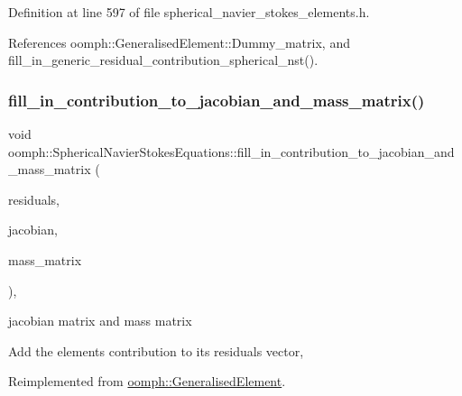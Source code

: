 Definition at line 597 of file spherical\+\_\+navier\+\_\+stokes\+\_\+elements.\+h.



References oomph\+::\+Generalised\+Element\+::\+Dummy\+\_\+matrix, and fill\+\_\+in\+\_\+generic\+\_\+residual\+\_\+contribution\+\_\+spherical\+\_\+nst().

\mbox{\label{classoomph_1_1SphericalNavierStokesEquations_acc7eab4a9151a3bda8ca0056c5a38137}} 
\subsubsection{\texorpdfstring{fill\+\_\+in\+\_\+contribution\+\_\+to\+\_\+jacobian\+\_\+and\+\_\+mass\+\_\+matrix()}{fill\_in\_contribution\_to\_jacobian\_and\_mass\_matrix()}}
{\footnotesize\ttfamily void oomph\+::\+Spherical\+Navier\+Stokes\+Equations\+::fill\+\_\+in\+\_\+contribution\+\_\+to\+\_\+jacobian\+\_\+and\+\_\+mass\+\_\+matrix (\begin{DoxyParamCaption}\item[{\hyperlink{classoomph_1_1Vector}{Vector}$<$ double $>$ \&}]{residuals,  }\item[{\hyperlink{classoomph_1_1DenseMatrix}{Dense\+Matrix}$<$ double $>$ \&}]{jacobian,  }\item[{\hyperlink{classoomph_1_1DenseMatrix}{Dense\+Matrix}$<$ double $>$ \&}]{mass\+\_\+matrix }\end{DoxyParamCaption})\hspace{0.3cm}{\ttfamily [inline]}, {\ttfamily [virtual]}}



jacobian matrix and mass matrix 

Add the element\textquotesingle{}s contribution to its residuals vector, 

Reimplemented from \hyperlink{classoomph_1_1GeneralisedElement_a2b6294a730647cf865da94f2531466f8}{oomph\+::\+Generalised\+Element}.



